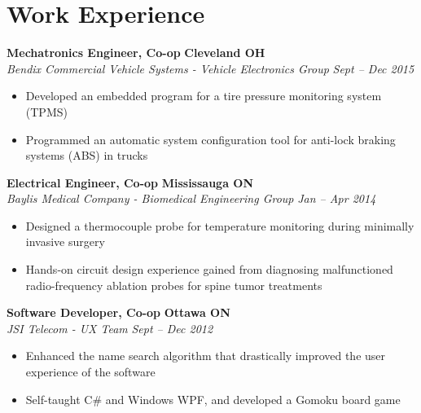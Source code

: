 \section*{Work Experience}
    \vspace{\postsubhead}
    \textbf{Mechatronics Engineer, Co-op}
    \hfill
    \textbf{Cleveland OH}\\
    \textit{Bendix Commercial Vehicle Systems - Vehicle Electronics Group}
    \hfill
    \textit{Sept -- Dec 2015}
    \begin{itemize}
        \setlength\itemsep{0.2em}
        \item Developed an embedded program for a tire pressure monitoring system (TPMS)
        \item Programmed an automatic system configuration tool for anti-lock braking systems (ABS) in trucks
    \end{itemize}
    \vspace{\interlist}

    \textbf{Electrical Engineer, Co-op}
    \hfill
    \textbf{Mississauga ON}\\
    \textit{Baylis Medical Company - Biomedical Engineering Group}
    \hfill
    \textit{Jan -- Apr 2014}
    \begin{itemize}
        \setlength\itemsep{0.2em}
        \item Designed a thermocouple probe for temperature monitoring during minimally invasive surgery
        \item Hands-on circuit design experience gained from diagnosing malfunctioned radio-frequency ablation probes for spine tumor treatments
    \end{itemize}
    \vspace{\interlist}
    
    \textbf{Software Developer, Co-op}
    \hfill
    \textbf{Ottawa ON}\\
    \textit{JSI Telecom - UX Team}
    \hfill
    \textit{Sept -- Dec 2012}
    \begin{itemize}
        \setlength\itemsep{0.2em}
        \item Enhanced the name search algorithm that drastically improved the user experience of the software
        \item Self-taught C\# and Windows WPF, and developed a Gomoku board game
    \end{itemize}
    \vspace{\interlist}
    
